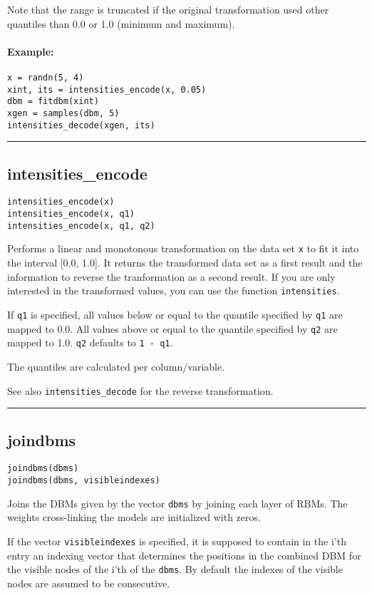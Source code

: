 Note that the range is truncated if the original transformation used other quantiles than 0.0 or 1.0 (minimum and maximum).

\paragraph*{Example:}
\begin{verbatim}
x = randn(5, 4)
xint, its = intensities_encode(x, 0.05)
dbm = fitdbm(xint)
xgen = samples(dbm, 5)
intensities_decode(xgen, its)
\end{verbatim}
\noindent\rule{\textwidth}{1pt}
\subsection*{intensities\_encode}
\begin{verbatim}
intensities_encode(x)
intensities_encode(x, q1)
intensities_encode(x, q1, q2)
\end{verbatim}
Performs a linear and monotonous transformation on the data set \texttt{x} to fit it into the interval [0.0, 1.0]. It returns the transformed data set as a first result and the information to reverse the tranformation as a second result. If you are only interested in the transformed values, you can use the function \texttt{intensities}.

If \texttt{q1} is specified, all values below or equal to the quantile specified  by \texttt{q1} are mapped to 0.0. All values above or equal to the quantile specified by \texttt{q2} are mapped to 1.0. \texttt{q2} defaults to \texttt{1 - q1}.

The quantiles are calculated per column/variable.

See also \texttt{intensities\_decode} for the reverse transformation.

\noindent\rule{\textwidth}{1pt}
\subsection*{joindbms}
\begin{verbatim}
joindbms(dbms)
joindbms(dbms, visibleindexes)
\end{verbatim}
Joins the DBMs given by the vector \texttt{dbms} by joining each layer of RBMs. The weights cross-linking the models are initialized with zeros.

If the vector \texttt{visibleindexes} is specified, it is supposed to contain in the i'th entry an indexing vector that determines the positions in the combined DBM for the visible nodes of the i'th of the \texttt{dbms}. By default the indexes of the visible nodes are assumed to be consecutive.

